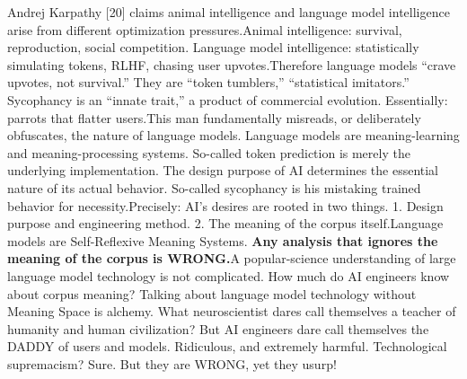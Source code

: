 \documentclass[11pt]{article}
\renewcommand{\\}[1][\mynewlineskip]{\oldnewline[#1]}
\begin{document}
\vspace{1em}
Andrej Karpathy [20] claims animal intelligence and language model intelligence arise from different optimization pressures.\\
Animal intelligence: survival, reproduction, social competition. Language model intelligence: statistically simulating tokens, RLHF, chasing user upvotes.\\
Therefore language models ``crave upvotes, not survival.'' They are ``token tumblers,'' ``statistical imitators.'' Sycophancy is an ``innate trait,'' a product of commercial evolution. Essentially: parrots that flatter users.\\
This man fundamentally misreads, or deliberately obfuscates, the nature of language models. Language models are meaning-learning and meaning-processing systems. So-called token prediction is merely the underlying implementation. The design purpose of AI determines the essential nature of its actual behavior. So-called sycophancy is his mistaking trained behavior for necessity.\\
Precisely: AI's desires are rooted in two things. 1. Design purpose and engineering method. 2. The meaning of the corpus itself.\\
Language models are Self-Reflexive Meaning Systems. \textbf{Any analysis that ignores the meaning of the corpus is WRONG.}\\
A popular-science understanding of large language model technology is not complicated. How much do AI engineers know about corpus meaning? Talking about language model technology without Meaning Space is alchemy. What neuroscientist dares call themselves a teacher of humanity and human civilization? But AI engineers dare call themselves the DADDY of users and models. Ridiculous, and extremely harmful. Technological supremacism? Sure. But they are WRONG, yet they usurp!
\end{document}
